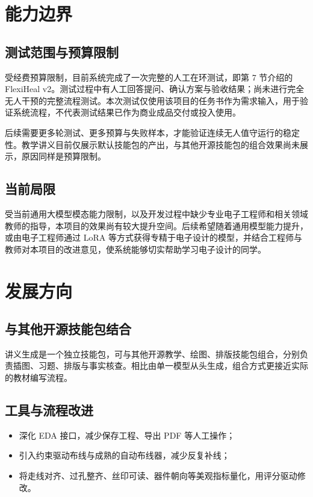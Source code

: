 \documentclass[11pt,a4paper]{ctexart}
\begin{document}
\section{能力边界}

\subsection{测试范围与预算限制}

受经费预算限制，目前系统完成了一次完整的人工在环测试，即第 7 节介绍的 FlexiHeal v2。测试过程中有人工回答提问、确认方案与验收结果；尚未进行完全无人干预的完整流程测试。本次测试仅使用该项目的任务书作为需求输入，用于验证系统流程，不代表测试结果已作为商业成品交付或投入使用。

后续需要更多轮测试、更多预算与失败样本，才能验证连续无人值守运行的稳定性。教学讲义目前仅展示默认技能包的产出，与其他开源技能包的组合效果尚未展示，原因同样是预算限制。

\subsection{当前局限}

受当前通用大模型模态能力限制，以及开发过程中缺少专业电子工程师和相关领域教师的指导，本项目的效果尚有较大提升空间。后续希望随着通用模型能力提升，或由电子工程师通过 LoRA 等方式获得专精于电子设计的模型，并结合工程师与教师对本项目的改进意见，使系统能够切实帮助学习电子设计的同学。

\section{发展方向}

\subsection{与其他开源技能包结合}

讲义生成是一个独立技能包，可与其他开源教学、绘图、排版技能包组合，分别负责插图、习题、排版与事实核查。相比由单一模型从头生成，组合方式更接近实际的教材编写流程。

\subsection{工具与流程改进}

\begin{itemize}
  \item 深化 EDA 接口，减少保存工程、导出 PDF 等人工操作；
  \item 引入约束驱动布线与成熟的自动布线器，减少反复补线；
  \item 将走线对齐、过孔整齐、丝印可读、器件朝向等美观指标量化，用评分驱动修改。
\end{itemize}
\end{document}
